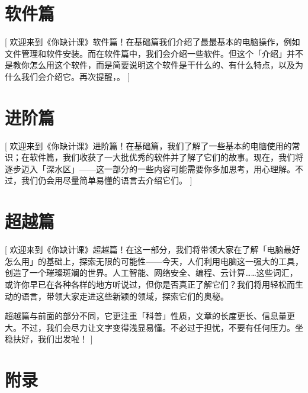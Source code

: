\documentclass[a4paper]{book}
\begin{document}
\part{软件篇}[
  欢迎来到《你缺计课》软件篇！在基础篇我们介绍了最最基本的电脑操作，例如文件管理和软件安装。而在软件篇中，我们会介绍一些软件。但这个「介绍」并不是教你怎么用这个软件，而是简要说明这个软件是干什么的、有什么特点，以及为什么我们会介绍它。再次提醒，。
]








\part{进阶篇}[
  欢迎来到《你缺计课》进阶篇！在基础篇，我们了解了一些基本的电脑使用的常识；在软件篇，我们收获了一大批优秀的软件并了解了它们的故事。现在，我们将逐步迈入「深水区」——这一部分的一些内容可能需要你多加思考，用心理解。不过，我们仍会用尽量简单易懂的语言去介绍它们。
]








\part{超越篇}[
  欢迎来到《你缺计课》超越篇！在这一部分，我们将带领大家在了解「电脑最好怎么用」的基础上，探索无限的可能性——今天，人们利用电脑这一强大的工具，创造了一个璀璨斑斓的世界。人工智能、网络安全、编程、云计算……这些词汇，或许你早已在各种各样的地方听说过，但你是否真正了解它们？我们将用轻松而生动的语言，带领大家走进这些新颖的领域，探索它们的奥秘。

  超越篇与前面的部分不同，它更注重「科普」性质，文章的长度更长、信息量更大。不过，我们会尽力让文字变得浅显易懂。不必过于担忧，不要有任何压力。坐稳扶好，我们出发啦！
]






\appendix
\part{附录}







\backmatter

\end{document}
